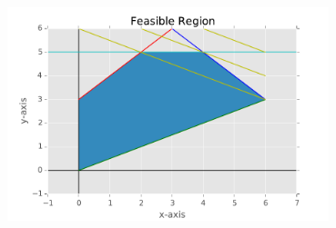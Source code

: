 \documentclass[fleqn]{homework}
\begin{document}
\begin{problem}{5}
    \begin{center}
      \includegraphics[width=0.7\textwidth]{feasibleb.pdf}
    \end{center}
  \end{problem}
\end{document}
